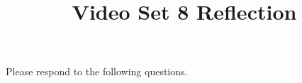 \documentclass[handout]{ximera}
\title{Video Set 8 Reflection}
\begin{document}
\begin{abstract}
\end{abstract}

\maketitle

Please respond to the following questions.

\end{document}
